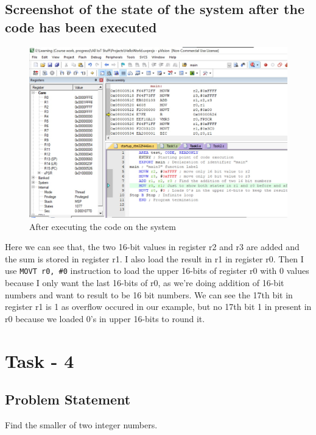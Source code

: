 \documentclass[footheight=20pt, footsepline, headheight=20pt, headsepline]{scrartcl}
\begin{document}
\subsection*{Screenshot of the state of the system after the code has been executed}
\begin{figure}[ht]
    \centering
    \includegraphics[scale=.75]{images/Task3After1.jpg}
    \caption{After executing the code on the system}
    \label{fig:after_task_three}
\end{figure}
\FloatBarrier
Here we can see that, the two 16-bit values in register r2 and r3 are added and the sum is stored in register r1. I also load the result in r1 in register r0. Then I use \verb|MOVT r0, #0| instruction to load the upper 16-bits of register r0 with 0 values because I only want the last 16-bits of r0, as we're doing addition of 16-bit numbers and want to result to be 16 bit numbers. We can see the 17th bit in register r1 is 1 as overflow occured in our example, but no 17th bit 1 in present in r0 because we loaded 0's in upper 16-bits to round it.


\newpage
\FloatBarrier
\section*{Task - 4}
\subsection*{Problem Statement}
Find the smaller of two integer numbers.
\end{document}
